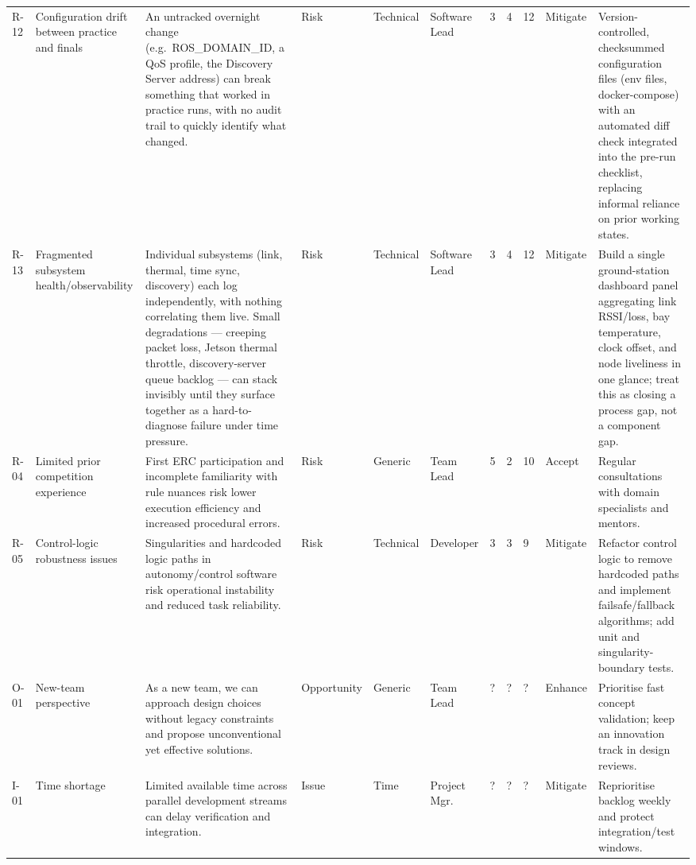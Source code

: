 \begin{longtable}{C{1.0cm} L{2.3cm} L{5.05cm} L{1.7cm} C{1.6cm} L{1.9cm} C{0.6cm} C{0.6cm} C{0.8cm} L{2.0cm} L{4.1cm}}
    R-12 & Configuration drift between practice and finals & An untracked overnight change (e.g.\ ROS\_DOMAIN\_ID, a QoS profile, the Discovery Server address) can break something that worked in practice runs, with no audit trail to quickly identify what changed. & Risk & Technical & Software Lead & 3 & 4 & 12 & Mitigate & Version-controlled, checksummed configuration files (env files, docker-compose) with an automated diff check integrated into the pre-run checklist, replacing informal reliance on prior working states. \\
    R-13 & Fragmented subsystem health/observability & Individual subsystems (link, thermal, time sync, discovery) each log independently, with nothing correlating them live. Small degradations --- creeping packet loss, Jetson thermal throttle, discovery-server queue backlog --- can stack invisibly until they surface together as a hard-to-diagnose failure under time pressure. & Risk & Technical & Software Lead & 3 & 4 & 12 & Mitigate & Build a single ground-station dashboard panel aggregating link RSSI/loss, bay temperature, clock offset, and node liveliness in one glance; treat this as closing a process gap, not a component gap. \\
    R-04 & Limited prior competition experience & First ERC participation and incomplete familiarity with rule nuances risk lower execution efficiency and increased procedural errors. & Risk & Generic & Team Lead & 5 & 2 & 10 & Accept & Regular consultations with domain specialists and mentors. \\
    R-05 & Control-logic robustness issues & Singularities and hardcoded logic paths in autonomy/control software risk operational instability and reduced task reliability. & Risk & Technical & Developer & 3 & 3 & 9 & Mitigate & Refactor control logic to remove hardcoded paths and implement failsafe/fallback algorithms; add unit and singularity-boundary tests. \\
    O-01 & New-team perspective & As a new team, we can approach design choices without legacy constraints and propose unconventional yet effective solutions. & Opportunity & Generic & Team Lead & ? & ? & ? & Enhance & Prioritise fast concept validation; keep an innovation track in design reviews. \\
    I-01 & Time shortage & Limited available time across parallel development streams can delay verification and integration. & Issue & Time & Project Mgr. & ? & ? & ? & Mitigate & Reprioritise backlog weekly and protect integration/test windows. \\

\end{longtable}
